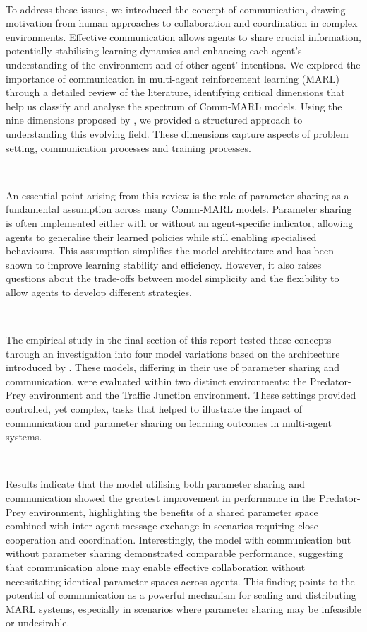 \documentclass{article}
\begin{document}
\

To address these issues, we introduced the concept of communication, drawing motivation from human approaches to collaboration and coordination in complex environments. Effective communication allows agents to share crucial information, potentially stabilising learning dynamics and enhancing each agent's understanding of the environment and of other agent' intentions. We explored the importance of communication in multi-agent reinforcement learning (MARL) through a detailed review of the literature, identifying critical dimensions that help us classify and analyse the spectrum of Comm-MARL models. Using the nine dimensions proposed by \citet{zhu2024survey}, we provided a structured approach to understanding this evolving field. These dimensions capture aspects of problem setting, communication processes and training processes.

\

An essential point arising from this review is the role of parameter sharing as a fundamental assumption across many Comm-MARL models. Parameter sharing is often implemented either with or without an agent-specific indicator, allowing agents to generalise their learned policies while still enabling specialised behaviours. This assumption simplifies the model architecture and has been shown to improve learning stability and efficiency. However, it also raises questions about the trade-offs between model simplicity and the flexibility to allow agents to develop different strategies.

\

The empirical study in the final section of this report tested these concepts through an investigation into four model variations based on the architecture introduced by \citet{pina2024fully}. These models, differing in their use of parameter sharing and communication, were evaluated within two distinct environments: the Predator-Prey environment and the Traffic Junction environment. These settings provided controlled, yet complex, tasks that helped to illustrate the impact of communication and parameter sharing on learning outcomes in multi-agent systems.

\

Results indicate that the model utilising both parameter sharing and communication showed the greatest improvement in performance in the Predator-Prey environment, highlighting the benefits of a shared parameter space combined with inter-agent message exchange in scenarios requiring close cooperation and coordination. Interestingly, the model with communication but without parameter sharing demonstrated comparable performance, suggesting that communication alone may enable effective collaboration without necessitating identical parameter spaces across agents. This finding points to the potential of communication as a powerful mechanism for scaling and distributing MARL systems, especially in scenarios where parameter sharing may be infeasible or undesirable.
\end{document}
